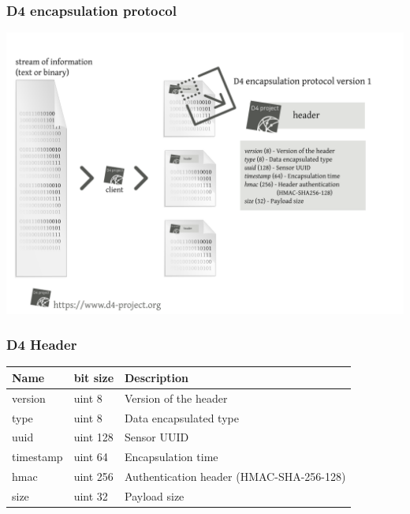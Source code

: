\documentclass{beamer}
\begin{document}
\begin{frame}
        \frametitle{D4 encapsulation protocol}
        \includegraphics[scale=0.38]{../../diagram/d4-protocol-encapsulation.png}
\end{frame}

\begin{frame}
    \frametitle{D4 Header}
    \begin{tabular}{|l|l|l|}
        \hline
        Name & 	bit size&  	Description\\
        \hline
        version &	uint 8 &	Version of the header \\
        type 	& uint 8   &	Data encapsulated type\\
        uuid 	& uint 128 & 	Sensor UUID\\
        timestamp &  	uint 64 &	Encapsulation time\\
        hmac 	& uint 256 &	Authentication header (HMAC-SHA-256-128)\\
        size 	& uint 32 	& Payload size\\
        \hline
    \end{tabular}
\end{frame}
\end{document}
